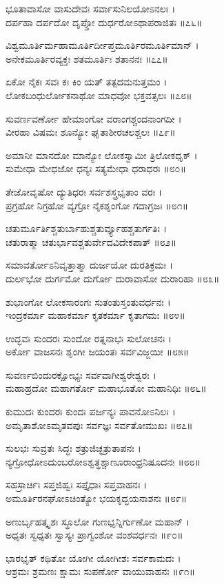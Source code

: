 ಭೂತಾವಾಸೋ ವಾಸುದೇವಃ ಸರ್ವಾಸುನಿಲಯೋಽನಲಃ ।\\
ದರ್ಪಹಾ ದರ್ಪದೋ ದೃಪ್ತೋ ದುರ್ಧರೋಽಥಾಪರಾಜಿತಃ ॥೭೬॥

ವಿಶ್ವಮೂರ್ತಿರ್ಮಹಾಮೂರ್ತಿರ್ದೀಪ್ತಮೂರ್ತಿರಮೂರ್ತಿಮಾನ್ ।\\
ಅನೇಕಮೂರ್ತಿರವ್ಯಕ್ತಃ ಶತಮೂರ್ತಿಃ ಶತಾನನಃ ॥೭೭॥

ಏಕೋ ನೈಕಃ ಸವಃ ಕಃ ಕಿಂ ಯತ್ ತತ್ಪದಮನುತ್ತಮಂ ।\\
ಲೋಕಬಂಧುರ್ಲೋಕನಾಥೋ ಮಾಧವೋ ಭಕ್ತವತ್ಸಲಃ ॥೭೮॥

ಸುವರ್ಣವರ್ಣೋ ಹೇಮಾಂಗೋ ವರಾಂಗಶ್ಚಂದನಾಂಗದೀ ।\\
ವೀರಹಾ ವಿಷಮಃ ಶೂನ್ಯೋ ಘೃತಾಶೀರಚಲಶ್ಚಲಃ ॥೭೯॥

ಅಮಾನೀ ಮಾನದೋ ಮಾನ್ಯೋ ಲೋಕಸ್ವಾಮೀ ತ್ರಿಲೋಕಧೃಕ್ ।\\
ಸುಮೇಧಾ ಮೇಧಜೋ ಧನ್ಯಃ ಸತ್ಯಮೇಧಾ ಧರಾಧರಃ ॥೮೦॥

ತೇಜೋವೃಷೋ ದ್ಯುತಿಧರಃ ಸರ್ವಶಸ್ತ್ರಭೃತಾಂ ವರಃ ।\\
ಪ್ರಗ್ರಹೋ ನಿಗ್ರಹೋ ವ್ಯಗ್ರೋ ನೈಕಶೃಂಗೋ ಗದಾಗ್ರಜಃ ॥೮೧॥

ಚತುರ್ಮೂರ್ತಿಶ್ಚತುರ್ಬಾಹುಶ್ಚತುರ್ವ್ಯೂಹಶ್ಚತುರ್ಗತಿಃ ।\\
ಚತುರಾತ್ಮಾ ಚತುರ್ಭಾವಶ್ಚತುರ್ವೇದವಿದೇಕಪಾತ್ ॥೮೨॥

ಸಮಾವರ್ತೋಽನಿವೃತ್ತಾತ್ಮಾ ದುರ್ಜಯೋ ದುರತಿಕ್ರಮಃ ।\\
ದುರ್ಲಭೋ ದುರ್ಗಮೋ ದುರ್ಗೋ ದುರಾವಾಸೋ ದುರಾರಿಹಾ ॥೮೩॥

ಶುಭಾಂಗೋ ಲೋಕಸಾರಂಗಃ ಸುತಂತುಸ್ತಂತುವರ್ಧನಃ ।\\
ಇಂದ್ರಕರ್ಮಾ ಮಹಾಕರ್ಮಾ ಕೃತಕರ್ಮಾ ಕೃತಾಗಮಃ ॥೮೪॥

ಉದ್ಭವಃ ಸುಂದರಃ ಸುಂದೋ ರತ್ನನಾಭಃ ಸುಲೋಚನಃ ।\\
ಅರ್ಕೋ ವಾಜಸನಃ ಶೃಂಗೀ ಜಯಂತಃ ಸರ್ವವಿಜ್ಜಯೀ ॥೮೫॥

ಸುವರ್ಣಬಿಂದುರಕ್ಷೋಭ್ಯಃ ಸರ್ವವಾಗೀಶ್ವರೇಶ್ವರಃ ।\\
ಮಹಾಹ್ರದೋ ಮಹಾಗರ್ತೋ ಮಹಾಭೂತೋ ಮಹಾನಿಧಿಃ ॥೮೬॥

ಕುಮುದಃ ಕುಂದರಃ ಕುಂದಃ ಪರ್ಜನ್ಯಃ ಪಾವನೋಽನಿಲಃ ।\\
ಅಮೃತಾಶೋಽಮೃತವಪುಃ ಸರ್ವಜ್ಞಃ ಸರ್ವತೋಮುಖಃ ॥೮೭॥

ಸುಲಭಃ ಸುವ್ರತಃ ಸಿದ್ಧಃ ಶತ್ರುಜಿಚ್ಛತ್ರುತಾಪನಃ ।\\
ನ್ಯಗ್ರೋಧೋಽದುಂಬರೋಽಶ್ವತ್ಥಶ್ಚಾಣೂರಾಂಧ್ರನಿಷೂದನಃ ॥೮೮॥

ಸಹಸ್ರಾರ್ಚಿಃ ಸಪ್ತಜಿಹ್ವಃ ಸಪ್ತೈಧಾಃ ಸಪ್ತವಾಹನಃ ।\\
ಅಮೂರ್ತಿರನಘೋಽಚಿಂತ್ಯೋ ಭಯಕೃದ್ಭಯನಾಶನಃ ॥೮೯॥

ಅಣುರ್ಬೃಹತ್ಕೃಶಃ ಸ್ಥೂಲೋ ಗುಣಭೃನ್ನಿರ್ಗುಣೋ ಮಹಾನ್ ।\\
ಅಧೃತಃ ಸ್ವಧೃತಃ ಸ್ವಾಸ್ಯಃ ಪ್ರಾಗ್ವಂಶೋ ವಂಶವರ್ಧನಃ ॥೯೦॥

ಭಾರಭೃತ್ ಕಥಿತೋ ಯೋಗೀ ಯೋಗೀಶಃ ಸರ್ವಕಾಮದಃ ।\\
ಆಶ್ರಮಃ ಶ್ರಮಣಃ ಕ್ಷಾಮಃ ಸುಪರ್ಣೋ ವಾಯುವಾಹನಃ ॥೯೧॥

